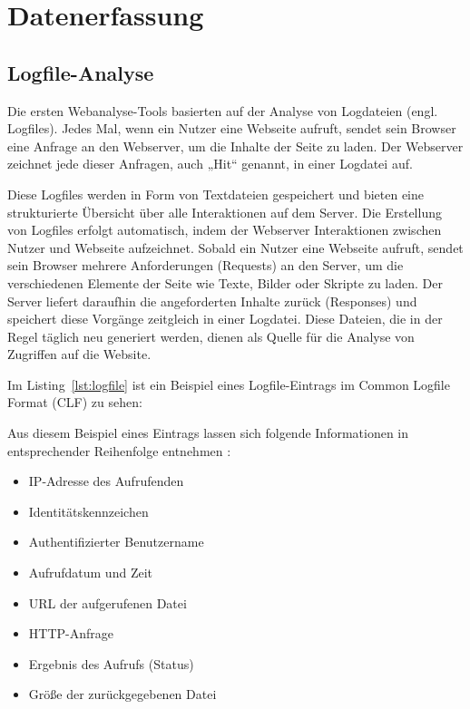 \section{Datenerfassung}
\label{sec:Datenerfassung}
\subsection{Logfile-Analyse}
Die ersten Webanalyse-Tools basierten auf der Analyse von Logdateien (engl. Logfiles). Jedes Mal, wenn ein Nutzer eine Webseite aufruft, sendet sein Browser eine Anfrage an den Webserver, um die Inhalte der Seite zu laden. Der Webserver zeichnet jede dieser Anfragen, auch „Hit“ genannt, in einer Logdatei auf. \parencite[S.8]{Dykes2014}

Diese Logfiles werden in Form von Textdateien gespeichert und bieten eine strukturierte Übersicht über alle Interaktionen auf dem Server. Die Erstellung von Logfiles erfolgt automatisch, indem der Webserver Interaktionen zwischen Nutzer und Webseite aufzeichnet. Sobald ein Nutzer eine Webseite aufruft, sendet sein Browser mehrere Anforderungen (Requests) an den Server, um die verschiedenen Elemente der Seite wie Texte, Bilder oder Skripte zu laden. Der Server liefert daraufhin die angeforderten Inhalte zurück (Responses) und speichert diese Vorgänge zeitgleich in einer Logdatei. Diese Dateien, die in der Regel täglich neu generiert werden, dienen als Quelle für die Analyse von Zugriffen auf die Website. \parencite[Kap.2.2]{Hassler2019}

Im Listing~\ref{lst:logfile} ist ein Beispiel eines Logfile-Eintrags im Common Logfile Format (CLF) zu sehen:



Aus diesem Beispiel eines Eintrags lassen sich folgende Informationen in entsprechender Reihenfolge entnehmen \parencite{ApacheLogFiles}: \\


\begin{itemize}
    \item IP-Adresse des Aufrufenden
    \item Identitätskennzeichen
    \item Authentifizierter Benutzername
    \item Aufrufdatum und Zeit
    \item URL der aufgerufenen Datei
    \item HTTP-Anfrage
    \item Ergebnis des Aufrufs (Status)
    \item Größe der zurückgegebenen Datei
\end{itemize}

